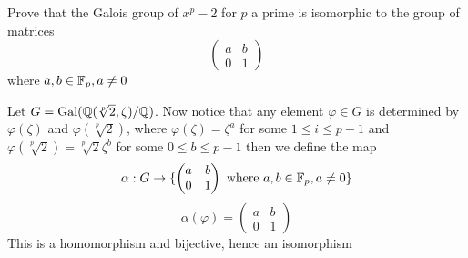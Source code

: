\begin{exercise}
    Prove that the Galois group of $x^p - 2$ for $p$ a prime is isomorphic to the group of matrices 
    $$
    \begin{pmatrix}
        a & b \\
        0 & 1
    \end{pmatrix}$$ where $a, b \in \mathbb{F}_p, a \neq 0$
\end{exercise}
\begin{solution}
    Let $G = \operatorname{Gal}(\mathbb{Q}(\sqrt[p]{2}, \zeta)/\mathbb{Q})$. Now notice that any element $\varphi \in G$ is determined by $\varphi(\zeta)$ and $\varphi(\sqrt[p]{2})$, where $\varphi(\zeta) = \zeta^a$ for some $1 \leq i \leq p-1$ and $\varphi(\sqrt[p]{2}) = \sqrt[p]{2}\zeta^b$ for some $0 \leq b \leq p-1$ then we define the map 
    \[\alpha:G \to
    \{\begin{pmatrix}
        a & b \\
        0 & 1
    \end{pmatrix} \text{ where }a, b \in \mathbb{F}_p, a \neq 0\}\]
    \[\alpha(\varphi) = \begin{pmatrix}
        a & b \\
        0 & 1
    \end{pmatrix}\]
    This is a homomorphism and bijective, hence an isomorphism 
\end{solution}

